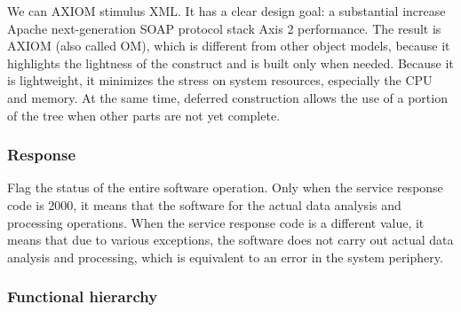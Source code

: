 We can AXIOM stimulus XML.
It has a clear design goal: a substantial increase Apache next-generation SOAP protocol stack Axis 2 performance.
The result is AXIOM (also called OM), which is different from other object models, because it highlights the lightness of the construct and is built only when needed.
Because it is lightweight, it minimizes the stress on system resources, especially the CPU and memory.
At the same time, deferred construction allows the use of a portion of the tree when other parts are not yet complete.

\subsubsection{Response}

Flag the status of the entire software operation.
Only when the service response code is 2000, it means that the software for the actual data analysis and processing operations.
When the service response code is a different value, it means that due to various exceptions, the software does not carry out actual data analysis and processing, which is equivalent to an error in the system periphery.

\subsubsection{Functional hierarchy}

